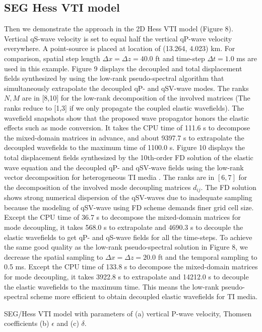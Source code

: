\subsection{SEG Hess VTI model}

Then we demonstrate the approach in the 2D Hess VTI model (Figure 8).
Vertical qS-wave velocity is set to equal half the vertical qP-wave velocity everywhere.
A point-source is placed at location of (13.264, 4.023) km.
For comparison, spatial step length $\Delta{x}=\Delta{z}=40.0$ ft and time-step $\Delta{t}=1.0$
ms are used in this example.
Figure 9 displays the decoupled and total displacement fields synthesized by using the low-rank pseudo-spectral algorithm
that simultaneously extrapolate the decoupled qP- and qSV-wave modes. The ranks $N, M$ are in [8,10] for the low-rank
	decomposition of the involved matrices (The ranks reduce to [1,3] if we only propagate the coupled elastic wavefields).
The wavefield snapshots show that the proposed wave propagator honors the elastic effects such as mode conversion.
It takes the CPU time of 111.6 s to decompose the mixed-domain matrices in advance, and about 9397.7 s to extrapolate the
	decoupled wavefields to the maximum time of 1100.0 s.
Figure 10 displays the total displacement fields synthesized by the 10th-order FD solution of the elastic
wave equation and the decoupled qP- and qSV-wave fields using the low-rank vector decomposition
for heterogeneous TI media \cite[]{cheng.fomel:2014}.
The ranks are in $[6,7]$ for the decomposition of the involved mode decoupling matrices $d_{ij}$.
The FD solution shows strong numerical dispersion of the qSV-waves due to inadequate
sampling because the modeling of qSV-wave using FD scheme demands finer grid cell size.
Except the CPU time of 36.7 s to decompose the mixed-domain matrices for mode decoupling,
 it takes 568.0 s to extrapolate and 4690.3 s to decouple the elastic wavefields
to get qP- and qS-wave fields for all the time-steps.
To achieve the same good quality as the low-rank pseudo-spectral solution in Figure 8, we decrease the spatial
sampling to $\Delta{x}=\Delta{z}=20.0$ ft and the temporal sampling to 0.5 ms.
Except the CPU time of 133.8 s to decompose the mixed-domain matrices for mode decoupling,
 it takes 3922.8 s to extrapolate and 14212.0 s to decouple the elastic wavefields to the maximum time.
This means the low-rank pseudo-spectral scheme more efficient to obtain decoupled elastic wavefields
for TI media.

  {
SEG/Hess VTI model with parameters of (a) vertical P-wave velocity, Thomsen coefficients
(b) $\epsilon$ and (c) $\delta$.
}

